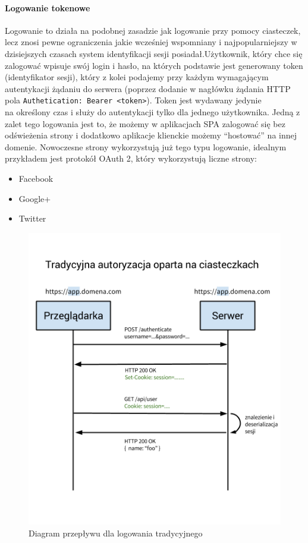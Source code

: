 \documentclass[10pt,titlepage]{article}
\begin{document}
\paragraph{Logowanie tokenowe}
Logowanie to działa na podobnej zasadzie jak logowanie przy pomocy ciasteczek, lecz znosi pewne ograniczenia jakie wcześniej wspomniany i najpopularniejszy w dzisiejszych czasach system identyfikacji sesji posiadał.Użytkownik, który chce się zalogować wpisuje swój login i hasło, na których podstawie jest generowany token (identyfikator sesji), który z kolei podajemy przy każdym wymagającym autentykacji żądaniu do serwera (poprzez dodanie w nagłówku żądania HTTP pola \verb|Authetication: Bearer <token>|). Token jest wydawany jedynie\\ na określony czas i służy do autentykacji tylko dla jednego użytkownika. Jedną z zalet tego logowania jest to, że możemy w aplikacjach SPA zalogować się bez odświeżenia strony i dodatkowo aplikacje klienckie możemy ``hostować'' na innej domenie. Nowoczesne strony wykorzystują już tego typu logowanie, idealnym przykładem jest protokół OAuth 2, który wykorzystują liczne strony:
\begin{itemize}
  \item Facebook
  \item Google+
  \item Twitter
\end{itemize}
\begin{figure}[H]
  \centering
  \includegraphics[scale=0.355]{images/tokenAuth1.png}
  \caption{Diagram przepływu dla logowania tradycyjnego}
\end{figure}
\end{document}
